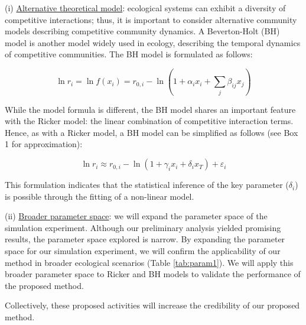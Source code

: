 \documentclass[12pt, class=article, crop=false]{standalone}
\begin{document}
(i) \ul{Alternative theoretical model}: ecological systems can exhibit a diversity of competitive interactions; thus, it is important to consider alternative community models describing competitive community dynamics. 
A Beverton-Holt (BH) model is another model widely used in ecology, describing the temporal dynamics of competitive communities. The BH model is formulated as follows:

\begin{equation}
    \label{eq:bh}
    \ln r_i = \ln f(x_i) = r_{0,i} - \ln(1 + \alpha_i x_i + \sum_j \beta_{ij} x_j)
\end{equation}

While the model formula is different, the BH model shares an important feature with the Ricker model: the linear combination of competitive interaction terms.
Hence, as with a Ricker model, a BH model can be simplified as follows (see Box 1 for approximation):

\begin{equation}
    \label{eq:bhmod}
    \ln r_i \approx r_{0,i} - \ln(1 + \gamma_i x_i + \delta_i x_T) + \varepsilon_i
\end{equation}

This formulation indicates that the statistical inference of the key parameter ($\delta_i$) is possible through the fitting of a non-linear model.

(ii) \ul{Broader parameter space}: we will expand the parameter space of the simulation experiment.
Although our preliminary analysis yielded promising results, the parameter space explored is narrow.
By expanding the parameter space for our simulation experiment,  we will confirm the applicability of our method in broader ecological scenarios (Table \ref{tab:param1}).
We will apply this broader parameter space to Ricker and BH models to validate the performance of the proposed method.

Collectively, these proposed activities will increase the credibility of our proposed method.
\end{document}
